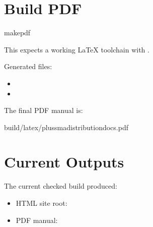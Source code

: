 \documentclass[letterpaper,10pt,english]{sphinxmanual}
\begin{document}
\section{Build PDF}
\label{\detokenize{build_outputs:build-pdf}}
\begin{sphinxVerbatim}[commandchars=\\\{\}]
makepdf
\end{sphinxVerbatim}

\sphinxAtStartPar
This expects a working LaTeX toolchain with .

\sphinxAtStartPar
Generated files:
\begin{itemize}
\item {} 
\sphinxAtStartPar
{}

\item {} 
\sphinxAtStartPar
{}

\end{itemize}

\sphinxAtStartPar
The final PDF manual is:

\begin{sphinxVerbatim}[commandchars=\\\{\}]
\PYGZus{}build/latex/plussma\PYGZus{}distribution\PYGZus{}docs.pdf
\end{sphinxVerbatim}


\section{Current Outputs}
\label{\detokenize{build_outputs:current-outputs}}
\sphinxAtStartPar
The current checked build produced:
\begin{itemize}
\item {} 
\sphinxAtStartPar
HTML site root: 

\item {} 
\sphinxAtStartPar
PDF manual: 

\end{itemize}
\end{document}
